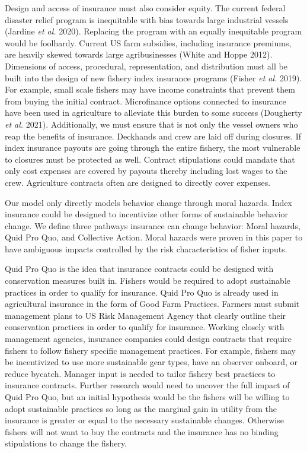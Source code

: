 \documentclass[
  letterpaper,
  DIV=11,
  numbers=noendperiod]{scrartcl}
\theoremstyle{plain}
\theoremstyle{plain}
\theoremstyle{remark}
\begin{document}
Design and access of insurance must also consider equity. The current
federal disaster relief program is inequitable with bias towards large
industrial vessels (Jardine \emph{et al.} 2020). Replacing the program
with an equally inequitable program would be foolhardy. Current US farm
subsidies, including insurance premiums, are heavily skewed towards
large agribusinesses (White and Hoppe 2012). Dimensions of access,
procedural, representation, and distribution must all be built into the
design of new fishery index insurance programs (Fisher \emph{et al.}
2019). For example, small scale fishers may have income constraints that
prevent them from buying the initial contract. Microfinance options
connected to insurance have been used in agriculture to alleviate this
burden to some success (Dougherty \emph{et al.} 2021). Additionally, we
must ensure that is not only the vessel owners who reap the benefits of
insurance. Deckhands and crew are laid off during closures. If index
insurance payouts are going through the entire fishery, the most
vulnerable to closures must be protected as well. Contract stipulations
could mandate that only cost expenses are covered by payouts thereby
including lost wages to the crew. Agriculture contracts often are
designed to directly cover expenses.

Our model only directly models behavior change through moral hazards.
Index insurance could be designed to incentivize other forms of
sustainable behavior change. We define three pathways insurance can
change behavior: Moral hazards, Quid Pro Quo, and Collective Action.
Moral hazards were proven in this paper to have ambiguous impacts
controlled by the risk characteristics of fisher inputs.

Quid Pro Quo is the idea that insurance contracts could be designed with
conservation measures built in. Fishers would be required to adopt
sustainable practices in order to qualify for insurance. Quid Pro Quo is
already used in agricultural insurance in the form of Good Farm
Practices. Farmers must submit management plans to US Risk Management
Agency that clearly outline their conservation practices in order to
qualify for insurance. Working closely with management agencies,
insurance companies could design contracts that require fishers to
follow fishery specific management practices. For example, fishers may
be incentivized to use more sustainable gear types, have an observer
onboard, or reduce bycatch. Manager input is needed to tailor fishery
best practices to insurance contracts. Further research would need to
uncover the full impact of Quid Pro Quo, but an initial hypothesis would
be the fishers will be willing to adopt sustainable practices so long as
the marginal gain in utility from the insurance is greater or equal to
the necessary sustainable changes. Otherwise fishers will not want to
buy the contracts and the insurance has no binding stipulations to
change the fishery.
\end{document}
